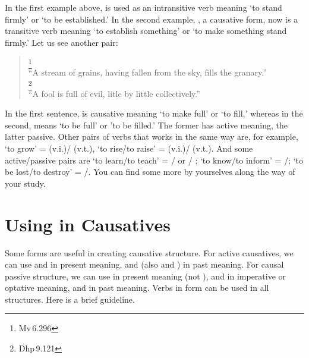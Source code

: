 In the first example above,  is used as an intransitive verb meaning `to stand firmly' or `to be established.' In the second example, , a causative form, now is a transitive verb meaning `to establish something' or `to make something stand firmly.' Let us see another pair:

\begin{quote}
\footnote{Mv\,6.296}\\
``A stream of grains, having fallen from the sky, fills the granary.''\\[1.5mm]
\footnote{Dhp\,9.121}\\
``A fool is full of evil, litle by little collectively.''\\[1.5mm]
\end{quote}

In the first sentence,  is causative meaning `to make full' or `to fill,' whereas in the second,  means `to be full' or 'to be filled.' The former has active meaning, the latter passive. Other pairs of verbs that works in the same way are, for example, `to grow' =  (v.i.)/ (v.t.), `to rise/to raise' =  (v.i.)/ (v.t.). And some active/passive pairs are `to learn/to teach' = / or / ; `to know/to inform' = /; `to be lost/to destroy' = /. You can find some more by yourselves along the way of your study.

{}
\section*{Using  in Causatives}

Some  forms are useful in creating causative structure. For active causatives, we can use  and  in present meaning, and  (also  and ) in past meaning. For causal passive structure, we can use  in present meaning (not ),  and  in imperative or optative meaning, and  in past meaning. Verbs in  form can be used in all structures. Here is a brief guideline.


